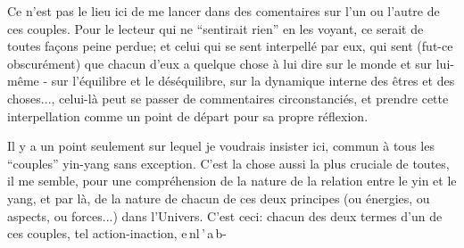 Ce n'est pas le lieu ici de me lancer dans des comentaires sur l'un ou l'autre de ces couples. Pour le lecteur qui ne ``sentirait rien'' en les voyant, ce serait de toutes façons peine perdue; et celui qui se sent interpellé par eux, qui sent (fut-ce obscurément) que chacun d'eux a quelque chose à lui dire sur le monde et sur lui-même - sur l'équilibre et le déséquilibre, sur la dynamique interne des êtres et des choses..., celui-là peut se passer de commentaires circonstanciés, et prendre cette interpellation comme un point de départ pour sa propre réflexion.

 Il y a un point seulement sur lequel je voudrais insister ici, commun à tous les ``couples'' yin-yang sans exception. C'est la chose aussi la plus cruciale de toutes, il me semble, pour une compréhension de la nature de la relation entre le yin et le yang, et par là, de la nature de chacun de ces deux principes (ou énergies, ou aspects, ou forces...) dans l'Univers. C'est ceci: chacun des deux termes d'un de ces couples, tel action-inaction, e\,n\quad l\,'\,a\,b-
\margin{\unsure{-}}
